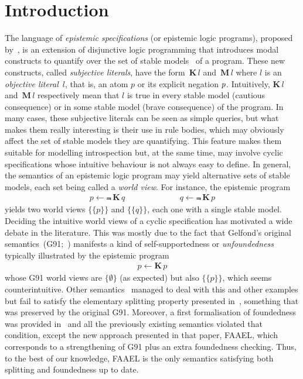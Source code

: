 \documentclass{new_tlp}
\def\K{\mathbf{K}\, }
\def\M{\mathbf{M}\, }
\let\sneg\relax
\newcommand{\sneg}{\ensuremath{\text{-}}}
\begin{document}
\section{Introduction}
\label{sec:intro}

The language of \emph{epistemic specifications} (or epistemic logic programs), proposed by~, is an extension of disjunctive logic programming that introduces modal constructs to quantify over the set of stable models~\cite{gellif88b} of a program.
%
These new constructs, called \emph{subjective literals}, have the form~$\K l$ and~$\M l$ where $l$ is an \emph{objective literal}~$l$, that is, an atom $p$ or its explicit negation $\sneg p$.
%
Intuitively, $\K l$ and~$\M l$ respectively mean that $l$ is true in every stable model (cautious consequence) or in some stable model (brave consequence) of the program.
%
In many cases, these subjective literals can be seen as simple queries, but what makes them really interesting is their use in rule bodies,
which may obviously affect the set of stable models they are quantifying.
%
This feature makes them suitable for modelling introspection but, at the same time, may involve cyclic specifications whose intuitive behaviour is not always easy to define.
%
In general, the semantics of an epistemic logic program may yield alternative sets of stable models, each set being called a \emph{world view}.
%
For instance, the epistemic program
\begin{eqnarray}
p \leftarrow \Not \, \K q \hspace{80pt}
q \leftarrow \Not \, \K p  \label{f:epiloop}
\end{eqnarray}
%
yields two world views $\{\{p\}\}$ and $\{\{q\}\}$, each one with a single stable model.
%
Deciding the intuitive world views of a cyclic specification has motivated a wide debate in the literature.
%
This was mostly due to the fact that Gelfond's original \mbox{semantics (G91;~)} manifests a kind of self-supportedness or \emph{unfoundedness} typically illustrated by the epistemic program
\begin{eqnarray}
p \leftarrow \K p \label{f:selfsupport}
\end{eqnarray}
whose G91 world views are $\{\emptyset\}$ (as expected) but also $\{\{p\}\}$, which seems counterintuitive.
%
Other semantics~\cite{kawabagezh15,faheir15a,sheeit17a} managed to deal with this and other examples but fail to satisfy the elementary splitting property presented in~\cite{cafafa19a}, something that was preserved by the original G91.
%
Moreover, a first formalisation of foundedness was provided in~\cite{cafafa19b} and all the previously existing semantics violated that condition, except the new approach presented in that paper, FAAEL, which corresponds to a strengthening of G91 plus an extra foundedness checking.
%
Thus, to the best of our knowledge, FAAEL is the only semantics satisfying both splitting and foundedness up to date.
\end{document}
